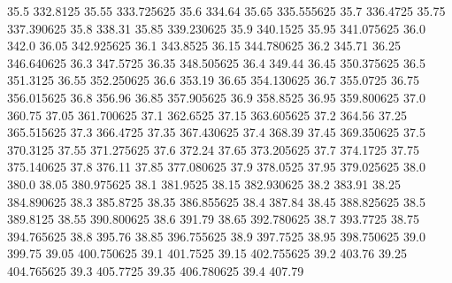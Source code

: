            35.5         332.8125
          35.55       333.725625
           35.6           334.64
          35.65       335.555625
           35.7         336.4725
          35.75       337.390625
           35.8           338.31
          35.85       339.230625
           35.9         340.1525
          35.95       341.075625
           36.0            342.0
          36.05       342.925625
           36.1         343.8525
          36.15       344.780625
           36.2           345.71
          36.25       346.640625
           36.3         347.5725
          36.35       348.505625
           36.4           349.44
          36.45       350.375625
           36.5         351.3125
          36.55       352.250625
           36.6           353.19
          36.65       354.130625
           36.7         355.0725
          36.75       356.015625
           36.8           356.96
          36.85       357.905625
           36.9         358.8525
          36.95       359.800625
           37.0           360.75
          37.05       361.700625
           37.1         362.6525
          37.15       363.605625
           37.2           364.56
          37.25       365.515625
           37.3         366.4725
          37.35       367.430625
           37.4           368.39
          37.45       369.350625
           37.5         370.3125
          37.55       371.275625
           37.6           372.24
          37.65       373.205625
           37.7         374.1725
          37.75       375.140625
           37.8           376.11
          37.85       377.080625
           37.9         378.0525
          37.95       379.025625
           38.0            380.0
          38.05       380.975625
           38.1         381.9525
          38.15       382.930625
           38.2           383.91
          38.25       384.890625
           38.3         385.8725
          38.35       386.855625
           38.4           387.84
          38.45       388.825625
           38.5         389.8125
          38.55       390.800625
           38.6           391.79
          38.65       392.780625
           38.7         393.7725
          38.75       394.765625
           38.8           395.76
          38.85       396.755625
           38.9         397.7525
          38.95       398.750625
           39.0           399.75
          39.05       400.750625
           39.1         401.7525
          39.15       402.755625
           39.2           403.76
          39.25       404.765625
           39.3         405.7725
          39.35       406.780625
           39.4           407.79
